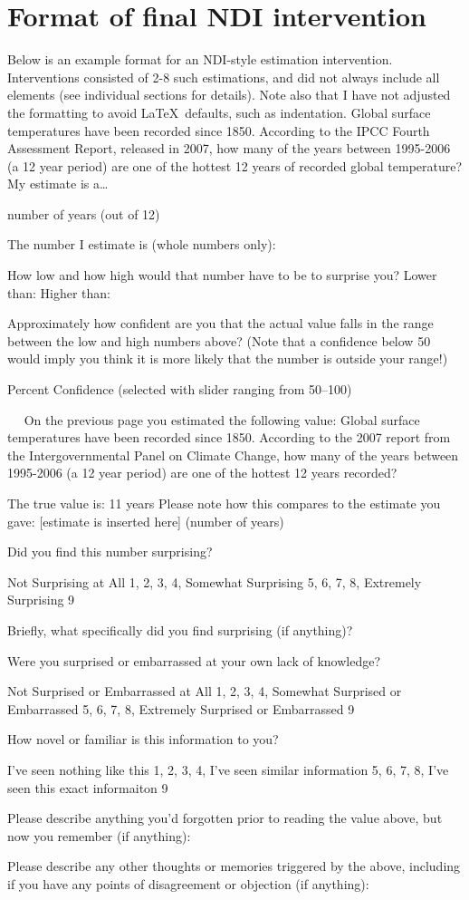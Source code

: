 \chapter{Format of final NDI intervention}
\label{chap:format-ndi}

Below is an example format for an NDI-style estimation intervention.
Interventions consisted of 2-8 such estimations, and did not always include all
elements (see individual sections for details). Note also that I have not
adjusted the formatting to avoid \LaTeX\ defaults, such as indentation. 
\hline
Global surface temperatures have been recorded since 1850. According to the IPCC
Fourth Assessment Report, released in 2007, how many of the years between
1995-2006 (a 12 year period) are one of the hottest 12 years of recorded global
temperature? My estimate is a…

number of years (out of 12)

The number I estimate is (whole numbers only):

How low and how high would that number have to be to surprise you?
Lower than: 
Higher than:

Approximately how confident are you that the actual value falls in the range
between the low and high numbers above? (Note that a confidence below 50 would
imply you think it is more likely that the number is outside your range!)

\underline{\hspace{3cm}} Percent Confidence (selected with slider ranging from
50–100)

 
On the previous page you estimated the following value:  Global surface
temperatures have been recorded since 1850. According to the 2007 report from
the Intergovernmental Panel on Climate Change, how many of the years between
1995-2006 (a 12 year period) are one of the hottest 12 years recorded?

The true value is: 11 years  Please note how this compares to the estimate you
gave: [estimate is inserted here] (number of years)

Did you find this number surprising?

Not Surprising at All 1, 2, 3, 4, Somewhat Surprising 5, 6, 7, 8, Extremely
Surprising 9

Briefly, what specifically did you find surprising (if anything)?

Were you surprised or embarrassed at your own lack of knowledge?

Not Surprised or Embarrassed at All 1, 2, 3, 4, Somewhat Surprised or
Embarrassed 5, 6, 7, 8, Extremely Surprised or Embarrassed 9

How novel or familiar is this information to you?

I've seen nothing like this 1, 2, 3, 4, I've seen similar information 5, 6, 7,
8, I've seen this exact informaiton 9 

Please describe anything you'd forgotten prior to reading the value above, but
now you remember (if anything):

Please describe any other thoughts or memories triggered by the above, including
if you have any points of disagreement or objection (if anything):
